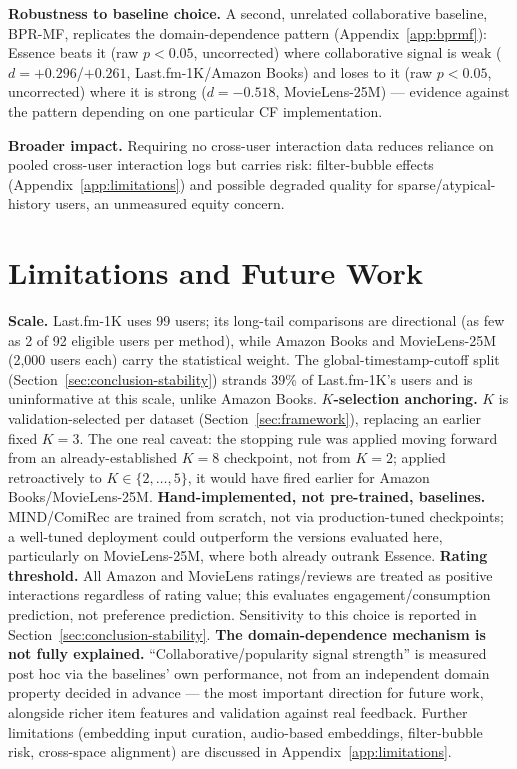 \documentclass{article}
\begin{document}
\textbf{Robustness to baseline choice.} A second, unrelated collaborative baseline, BPR-MF, replicates the domain-dependence pattern (Appendix~\ref{app:bprmf}): Essence beats it (raw $p<0.05$, uncorrected) where collaborative signal is weak ($d=+0.296$/$+0.261$, Last.fm-1K/Amazon Books) and loses to it (raw $p<0.05$, uncorrected) where it is strong ($d=-0.518$, MovieLens-25M) --- evidence against the pattern depending on one particular CF implementation.

\textbf{Broader impact.} Requiring no cross-user interaction data reduces reliance on pooled cross-user interaction logs but carries risk: filter-bubble effects (Appendix~\ref{app:limitations}) and possible degraded quality for sparse/atypical-history users, an unmeasured equity concern.

\section{Limitations and Future Work}
\label{sec:limitations}

\textbf{Scale.} Last.fm-1K uses 99 users; its long-tail comparisons are directional (as few as 2 of 92 eligible users per method), while Amazon Books and MovieLens-25M (2{,}000 users each) carry the statistical weight. The global-timestamp-cutoff split (Section~\ref{sec:conclusion-stability}) strands 39\% of Last.fm-1K's users and is uninformative at this scale, unlike Amazon Books. \textbf{$K$-selection anchoring.} $K$ is validation-selected per dataset (Section~\ref{sec:framework}), replacing an earlier fixed $K=3$. The one real caveat: the stopping rule was applied moving forward from an already-established $K=8$ checkpoint, not from $K=2$; applied retroactively to $K\in\{2,\ldots,5\}$, it would have fired earlier for Amazon Books/MovieLens-25M. \textbf{Hand-implemented, not pre-trained, baselines.} MIND/ComiRec are trained from scratch, not via production-tuned checkpoints; a well-tuned deployment could outperform the versions evaluated here, particularly on MovieLens-25M, where both already outrank Essence. \textbf{Rating threshold.} All Amazon and MovieLens ratings/reviews are treated as positive interactions regardless of rating value; this evaluates engagement/consumption prediction, not preference prediction. Sensitivity to this choice is reported in Section~\ref{sec:conclusion-stability}. \textbf{The domain-dependence mechanism is not fully explained.} ``Collaborative/popularity signal strength'' is measured post hoc via the baselines' own performance, not from an independent domain property decided in advance --- the most important direction for future work, alongside richer item features and validation against real feedback. Further limitations (embedding input curation, audio-based embeddings, filter-bubble risk, cross-space alignment) are discussed in Appendix~\ref{app:limitations}.
\end{document}
